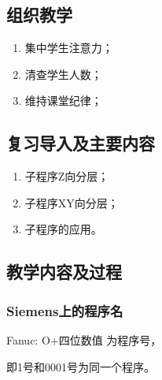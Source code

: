 \jxhj{%
	}

\makeshouye %

\subsection{组织教学}
\begin{enumerate}[\hspace{2em}1、]
	\item 集中学生注意力；
	\item 清查学生人数；
	\item 维持课堂纪律；
\end{enumerate}
\subsection{复习导入及主要内容}
\begin{enumerate}[1、]
\item 子程序Z向分层；
\item 子程序XY向分层；
\item 子程序的应用。
\end{enumerate}

\subsection{教学内容及过程}

\subsubsection{Siemens上的程序名}
Fanuc: O+四位数值 为程序号，

即1号和0001号为同一个程序。

